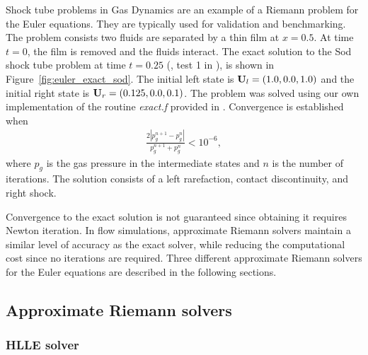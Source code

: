 Shock tube problems in Gas Dynamics are an example of a Riemann problem for the Euler equations.  They are typically used for validation and benchmarking.  The problem consists two fluids are separated by a thin film at $x = 0.5$.  At time $t=0$, the film is removed and the fluids interact.  The exact solution to the Sod shock tube problem at time $t=0.25$ (\citep{Sod:1978}, test 1 in \citep{Toro:1999}), is shown in Figure~\ref{fig:euler_exact_sod}.  The initial left state is $\mathbf{U}_l = (1.0,0.0,1.0)$ and the initial right state is $\mathbf{U}_r = (0.125,0.0,0.1)$.  The problem was solved using our own implementation of the routine \emph{exact.f} provided in \citep{Toro:1999}.  Convergence is established when 
\begin{gather}
\frac{2|p_g^{n+1} - p_g^{n}|}{p_g^{n+1} + p_g^{n}} < 10^{-6},
\end{gather}
where $p_g$ is the gas pressure in the intermediate states and $n$ is the number of iterations.  The solution consists of a left rarefaction, contact discontinuity, and right shock.  

Convergence to the exact solution is not guaranteed since obtaining it requires Newton iteration.  In flow simulations, approximate Riemann solvers maintain a similar level of accuracy as the exact solver, while reducing the computational cost since no iterations are required.  Three different approximate Riemann solvers for the Euler equations are described in the following sections.

\subsection[Approximate Riemann solvers]{Approximate Riemann solvers}
\label{sec:hydro_approx_rsolvers}

\subsubsection[HLLE solver]{HLLE solver}
\label{sec:hlle}

